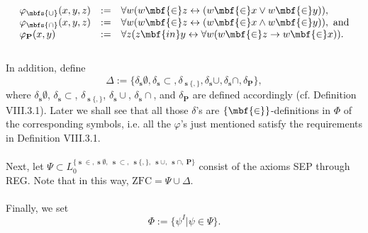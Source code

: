 \begin{enumerate}[1.]
\[\begin{array}{lll}
\varphi_\mbfs{\cup}(x,y,z)        & := & \forall w (w \mbf{\in} z \leftrightarrow (w \mbf{\in} x \lor w \mbf{\in} y)), \cr
\varphi_\mbfs{\cap}(x,y,z)        & := & \forall w (w \mbf{\in} z \leftrightarrow (w \mbf{\in} x \land w \mbf{\in} y)), \mbox{ and} \cr
\varphi_\mathbf{P}(x,y)  & := & \forall z (z \mbf{in} y \leftrightarrow \forall w (w \mbf{\in} z \rightarrow w \mbf{\in} x)).
\end{array}
\]
\\
In addition, define
\[
\Delta := \{ \delta_\mbfs{\emptyset}, \delta_\mbfs{\subset}, \delta_{ \mbfs{ \{ , \} } }, \delta_\mbfs{\cup}, \delta_\mbfs{\cap}, \delta_{\mathbf{P}} \},
\]
where $\delta_\mbfs{\emptyset}$, $\delta_\mbfs{\subset}$, $\delta_{ \mbfs{ \{ , \} } }$, $\delta_\mbfs{\cup}$, $\delta_\mbfs{\cap}$, and $\delta_{\mathbf{P}}$ are defined accordingly (cf. Definition VIII.3.1). Later we shall see that all those $\delta$'s are $\{ \mbf{\in} \}$-definitions in $\Phi$ of the corresponding symbols, i.e. all the $\varphi$'s just mentioned satisfy the requirements in Definition VIII.3.1.\\
\\
Next, let $\Psi \subset L_0^{ \{ \mbfs{\in}, \mbfs{\emptyset}, \ \mbfs{\subset}, \ \mbfs{ \{ , \} }, \ \mbfs{\cup}, \ \mbfs{\cap}, \ \mathbf{P} \} }$ consist of the axioms SEP through REG. Note that in this way, $\mbox{ZFC} = \Psi \cup \Delta$.\\
\\
Finally, we set
\[
\Phi := \{ \psi^I | \psi \in \Psi \}.
\]
\\

\end{enumerate}
